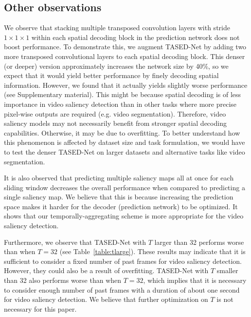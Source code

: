 \documentclass[10pt,twocolumn,letterpaper]{article}
\newcommand{\modelname}{TASED-Net}
\begin{document}
\subsection{Other observations} \label{subsec:dense}
We observe that stacking multiple transposed convolution layers with stride $1\times 1\times 1$ within each spatial decoding block in the prediction network does not boost performance. To demonstrate this, we augment \modelname{} by adding two more transposed convolutional layers to each spatial decoding block. This denser (or deeper) version approximately increases the network size by 40\%, so we expect that it would yield better performance by finely decoding spatial information. However, we found that it actually yields slightly worse performance (see Supplementary material). This might be because spatial decoding is of less importance in video saliency detection than in other tasks where more precise pixel-wise outputs are required (e.g. video segmentation). Therefore, video saliency models may not necessarily benefit from stronger spatial decoding capabilities. Otherwise, it may be due to overfitting. To better understand how this phenomenon is affected by dataset size and task formulation, we would have to test the denser \modelname{} on larger datasets and alternative tasks like video segmentation.

It is also observed that predicting multiple saliency maps all at once for each sliding window decreases the overall performance when compared to predicting a single saliency map. We believe that this is because increasing the prediction space makes it harder for the decoder (prediction network) to be optimized. It shows that our temporally-aggregating scheme is more appropriate for the video saliency detection.

Furthermore, we observe that \modelname{} with $T$ larger than 32 performs worse than when $T=32$ (see Table~\ref{table:tlarge}). These results may indicate that it is sufficient to consider a fixed number of past frames for video saliency detection. However, they could also be a result of overfitting. \modelname{} with $T$ smaller than 32 also performs worse than when $T=32$, which implies that it is necessary to consider enough number of past frames with a duration of about one second for video saliency detection. We believe that further optimization on $T$ is not necessary for this paper.
\end{document}
